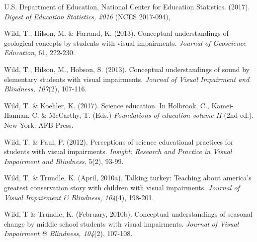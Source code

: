 \documentclass[11.5pt]{sig-alternate} %
\begin{document}
U.S. Department of Education, National Center for Education Statistics. (2017). \textit{Digest of Education Statistics, 2016} (NCES 2017-094),

Wild, T., Hilson, M. \& Farrand, K.  (2013).  Conceptual understandings of geological concepts by students with visual impairments. \textit{Journal of Geoscience Education}, 61, 222-230. 

Wild, T., Hilson, M., Hobson, S.  (2013).  Conceptual understandings of sound by elementary students with visual impairments.  \textit{Journal of Visual Impairment and Blindness, 107}(2), 107-116. 

Wild, T. \& Koehler, K.  (2017).  Science education.  In Holbrook, C., Kamei-Hannan, C, \& McCarthy, T.  (Eds.) \textit{Foundations of education volume II} (2nd ed.). New York: AFB Press.

Wild, T. \& Paul, P.  (2012).  Perceptions of science educational practices for students with visual impairments.  \textit{Insight: Research and Practice in Visual Impairment and Blindness}, 5(2), 93-99.

Wild, T. \& Trundle, K. (April, 2010a).  Talking turkey: Teaching about america’s greatest conservation story with children with visual impairments.  \textit{Journal of Visual Impairment \& Blindness, 104}(4), 198-201. 

Wild, T \& Trundle, K. (February, 2010b).  Conceptual understandings of seasonal change by middle school students with visual impairments. \textit{Journal of Visual Impairment \& Blindness, 104}(2), 107-108.  
\end{document}
